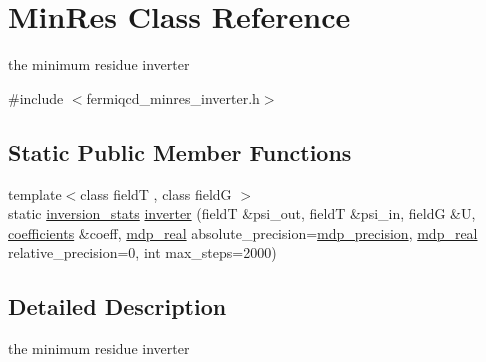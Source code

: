 \hypertarget{class_min_res}{}\section{Min\+Res Class Reference}
\label{class_min_res}


the minimum residue inverter  




{\ttfamily \#include $<$fermiqcd\+\_\+minres\+\_\+inverter.\+h$>$}

\subsection*{Static Public Member Functions}
\begin{DoxyCompactItemize}
\item 
{\footnotesize template$<$class fieldT , class fieldG $>$ }\\static \hyperlink{classinversion__stats}{inversion\+\_\+stats} \hyperlink{class_min_res_a866688e8e9e44a1032160bd7b2bc3a4f}{inverter} (fieldT \&psi\+\_\+out, fieldT \&psi\+\_\+in, fieldG \&U, \hyperlink{classcoefficients}{coefficients} \&coeff, \hyperlink{mdp__global__vars_8h_a69d96b74c791e0bbdb888b3913a69450}{mdp\+\_\+real} absolute\+\_\+precision=\hyperlink{mdp__global__vars_8h_a443a4ca745298420893e113a7ac926a9}{mdp\+\_\+precision}, \hyperlink{mdp__global__vars_8h_a69d96b74c791e0bbdb888b3913a69450}{mdp\+\_\+real} relative\+\_\+precision=0, int max\+\_\+steps=2000)
\end{DoxyCompactItemize}


\subsection{Detailed Description}
the minimum residue inverter 


